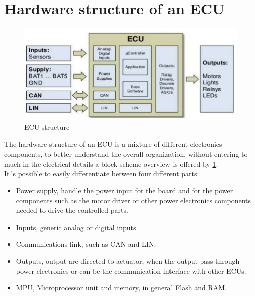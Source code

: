 \documentclass[../main.tex]{subfiles}
\begin{document}
\section{Hardware structure of an ECU}
\begin{figure}[h]
    \centering
    \includegraphics[width=\linewidth]{images_folder/electronic-control-unitecu-6-638.jpg}
    \caption{ECU structure}
    \label{fig:ECUHW}
\end{figure}
The hardware structure of an \gls{ECU} is a mixture of different electronics components, to better understand the overall organization, without entering to much in the electrical details a block scheme overview is offered by \ref{fig:ECUHW}.\\
It´s possible to easily differentiate between four different parts:
\begin{itemize}
    \item Power supply, handle the power input for the board and for the power components such as the motor driver or other power electronics components needed to drive the controlled parts. 
    \item Inputs, generic analog or digital inputs.
    \item Communications link, such as \gls{CAN} and \gls{LIN}.
    \item Outputs, output are directed to actuator, when the output pass through power electronics or can be the communication interface with other \gls{ECU}s.
    \item \gls{MPU}, Microprocessor unit and memory, in general Flash and \gls{RAM}. 
\end{itemize}
\end{document}
